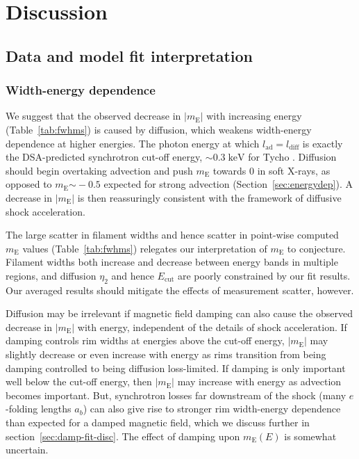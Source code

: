 \documentclass[iop, apj, numberedappendix]{emulateapj}
\newcommand*{\mt}{\mathrm}
\newcommand*{\unit}[1]{\;\mt{#1}}  %
\newcommand*{\abt}{\mathord{\sim}} %
\newcommand*{\mE}{m_\mt{E}}
\newcommand*{\Ecut}{E_{\mt{cut}}}
\begin{document}
\section{Discussion}

\subsection{Data and model fit interpretation}

\subsubsection{Width-energy dependence}

We suggest that the observed decrease in $|\mE|$ with increasing energy
(Table~\ref{tab:fwhms}) is caused by diffusion, which weakens width-energy
dependence at higher energies.  The photon energy at which $l_{\mt{ad}} =
l_{\mt{diff}}$ is exactly the DSA-predicted synchrotron cut-off energy,
$\abt0.3 \unit{keV}$ for Tycho \citep{hwang2002}.
Diffusion should begin overtaking advection and push $\mE$ towards $0$ in soft
X-rays, as opposed to $\mE \abt -0.5$ expected for strong advection
(Section~\ref{sec:energydep}).  A decrease in $|\mE|$ is then reassuringly
consistent with the framework of diffusive shock acceleration.

The large scatter in filament widths and hence scatter in point-wise computed
$\mE$ values (Table~\ref{tab:fwhms}) relegates our interpretation of $\mE$ to
conjecture.  Filament widths both increase and decrease between energy bands in
multiple regions, and diffusion $\eta_2$ and hence $\Ecut$ are poorly
constrained by our fit results.  Our averaged results should mitigate the
effects of measurement scatter, however.

Diffusion may be irrelevant if magnetic field damping can also cause the
observed decrease in $|\mE|$ with energy, independent of the details of shock
acceleration.  If damping controls rim widths at energies above the cut-off
energy, $|\mE|$ may slightly decrease or even increase with energy as rims
transition from being damping controlled to being diffusion loss-limited.  If
damping is only important well below the cut-off energy, then $|\mE|$ may
increase with energy as advection becomes important.  But, synchrotron
losses far downstream of the shock (many $e$-folding lengths $a_b$) can also
give rise to stronger rim width-energy dependence than expected for a damped
magnetic field, which we discuss further in section~\ref{sec:damp-fit-disc}.
The effect of damping upon $\mE(E)$ is somewhat uncertain.
\end{document}
